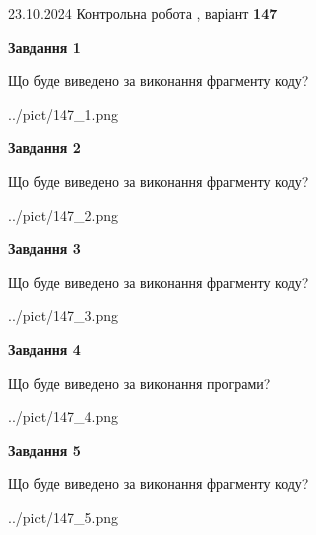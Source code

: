 \documentclass[12pt, ukrainian]{article}
\begin{document}
{\Large{23.10.2024 Контрольна робота , варіант  \No \textbf { 147 }\par}}
{
\begin {large}
{\begin {center}\textbf{Завдання 1}\end {center}}

Що буде виведено за виконання фрагменту коду?\par
\begin{center}
	{../pict/147_1.png}
\end{center}
\newpage

{\begin {center}\textbf{Завдання 2}\end {center}}

Що буде виведено за виконання фрагменту коду?\par
\begin{center}
	{../pict/147_2.png}
\end{center}
\newpage

{\begin {center}\textbf{Завдання 3}\end {center}}

Що буде виведено за виконання фрагменту коду?\par
\begin{center}
	{../pict/147_3.png}
\end{center}
\newpage

{\begin {center}\textbf{Завдання 4}\end {center}}

Що буде виведено за виконання програми?\par
\begin{center}
	{../pict/147_4.png}
\end{center}
\newpage

{\begin {center}\textbf{Завдання 5}\end {center}}

Що буде виведено за виконання фрагменту коду?\par
\begin{center}
	{../pict/147_5.png}
\end{center}
\newpage


\end{large}}
\end{document}
